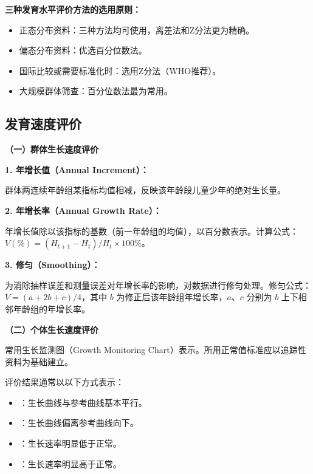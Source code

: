 \begin{tipbox}
\textbf{三种发育水平评价方法的选用原则：}

\begin{itemize}[leftmargin=*]
    \item 正态分布资料：三种方法均可使用，离差法和Z分法更为精确。
    \item 偏态分布资料：优选百分位数法。
    \item 国际比较或需要标准化时：选用Z分法（WHO推荐）。
    \item 大规模群体筛查：百分位数法最为常用。
\end{itemize}
\end{tipbox}

\subsection{发育速度评价}

\begin{keybox}
\textbf{（一）群体生长速度评价}

\textbf{1. 年增长值（Annual Increment）：}

群体两连续年龄组某指标均值相减，反映该年龄段儿童少年的绝对生长量。

\textbf{2. 年增长率（Annual Growth Rate）：}

年增长值除以该指标的基数（前一年龄组的均值），以百分数表示。计算公式：$V(\%) = (H_{t+1} - H_t) / H_t \times 100\%$。

\textbf{3. 修匀（Smoothing）：}

为消除抽样误差和测量误差对年增长率的影响，对数据进行修匀处理。修匀公式：$V = (a + 2b + c) / 4$，其中 $b$ 为修正后该年龄组年增长率，$a$、$c$ 分别为 $b$ 上下相邻年龄组的年增长率。

\textbf{（二）个体生长速度评价}

常用生长监测图（Growth Monitoring Chart）表示。所用正常值标准应以追踪性资料为基础建立。

评价结果通常以以下方式表示：
\begin{itemize}[leftmargin=*]
    \item {}：生长曲线与参考曲线基本平行。
    \item {}：生长曲线偏离参考曲线向下。
    \item {}：生长速率明显低于正常。
    \item {}：生长速率明显高于正常。
\end{itemize}
\end{keybox}

